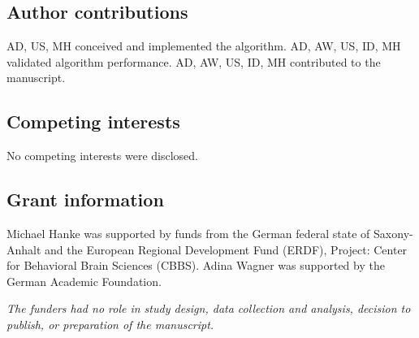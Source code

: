 \subsection*{Author contributions}


AD, US, MH conceived and implemented the algorithm.
AD, AW, US, ID, MH validated algorithm performance.
AD, AW, US, ID, MH contributed to the manuscript.

\subsection*{Competing interests}


No competing interests were disclosed.

\subsection*{Grant information}


Michael Hanke was supported by funds from the German federal state of
Saxony-Anhalt and the European Regional Development Fund (ERDF),
Project: Center for Behavioral Brain Sciences (CBBS).
Adina Wagner was supported by the German Academic Foundation.

\textit{The funders had no role in study design, data collection and analysis,
decision to publish, or preparation of the manuscript.}


